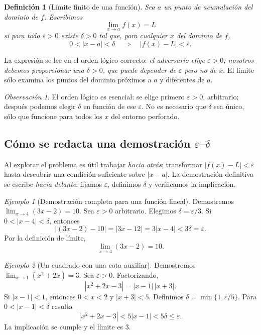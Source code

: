 \documentclass[12pt]{article}
\newtheorem{definicion}{Definición}[section]
\theoremstyle{remark}
\newtheorem{observacion}{Observación}
\newtheorem{ejemplo}{Ejemplo}
\begin{document}
\begin{definicion}[Límite finito de una función]
Sea $a$ un punto de acumulación del dominio de $f$. Escribimos
\[
 \lim_{x\to a}f(x)=L
\]
si para todo $\varepsilon>0$ existe $\delta>0$ tal que, para cualquier $x$ del dominio de $f$,
\[
 \boxed{0<|x-a|<\delta\quad\Longrightarrow\quad |f(x)-L|<\varepsilon.}
\]
\end{definicion}

La expresión se lee en el orden lógico correcto: \emph{el adversario elige $\varepsilon>0$; nosotros debemos proporcionar una $\delta>0$, que puede depender de $\varepsilon$ pero no de $x$}. El límite sólo examina los puntos del dominio próximos a $a$ y diferentes de $a$.

\begin{observacion}
El orden lógico es esencial: se elige primero $\varepsilon>0$, arbitrario; después podemos elegir $\delta$ en función de ese $\varepsilon$. No es necesario que $\delta$ sea único, sólo que funcione para todos los $x$ del entorno perforado.
\end{observacion}


\subsection*{Cómo se redacta una demostración $\varepsilon$--$\delta$}
Al explorar el problema es útil trabajar \emph{hacia atrás}: transformar $|f(x)-L|<\varepsilon$ hasta descubrir una condición suficiente sobre $|x-a|$. La demostración definitiva se escribe \emph{hacia delante}: fijamos $\varepsilon$, definimos $\delta$ y verificamos la implicación.

\begin{ejemplo}[Demostración completa para una función lineal]
Demostremos $\lim_{x\to4}(3x-2)=10$. Sea $\varepsilon>0$ arbitrario. Elegimos $\delta=\varepsilon/3$. Si $0<|x-4|<\delta$, entonces
\[
 |(3x-2)-10|=|3x-12|=3|x-4|<3\delta=\varepsilon.
\]
Por la definición de límite,
\[
 \boxed{\lim_{x\to4}(3x-2)=10.}
\]
\end{ejemplo}

\begin{ejemplo}[Un cuadrado con una cota auxiliar]
Demostremos $\lim_{x\to1}(x^2+2x)=3$. Sea $\varepsilon>0$. Factorizando,
\[
 |x^2+2x-3|=|x-1|\,|x+3|.
\]
Si $|x-1|<1$, entonces $0<x<2$ y $|x+3|<5$. Definimos $\delta=\min\{1,\varepsilon/5\}$. Para $0<|x-1|<\delta$ resulta
\[
 |x^2+2x-3|<5|x-1|<5\delta\le\varepsilon.
\]
La implicación se cumple y el límite es $3$.
\end{ejemplo}
\end{document}
